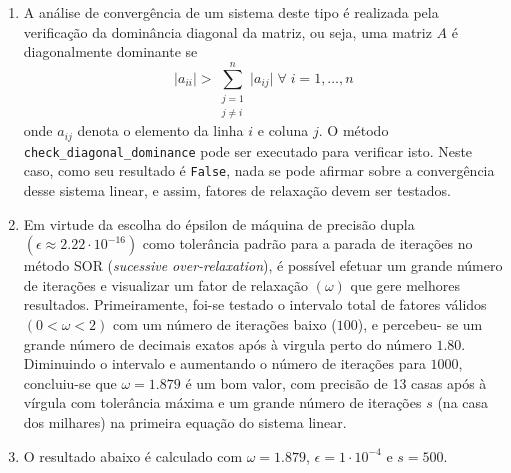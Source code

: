 \documentclass{sftex/sftex}
\begin{document}
\begin{enumerate}
\begin{enumerate}
\item A análise de convergência de um sistema deste tipo é realizada pela
verificação da dominância diagonal da matriz, ou seja, uma matriz $A$ é
diagonalmente dominante se
\begin{equation*}
\vert a_{ii} \vert > \sum_{\substack{j=1 \\ j \neq i}}^n \vert a_{ij} \vert
\; \forall \; i = 1, \dots, n
\end{equation*}
onde $a_{ij}$ denota o elemento da linha $i$ e coluna $j$. O método
\texttt{check\_diagonal\_dominance} pode ser executado para verificar isto.
Neste caso, como seu resultado é \verb!False!, nada se pode afirmar sobre a
convergência desse sistema linear, e assim, fatores de relaxação devem ser
testados.

\item Em virtude da escolha do épsilon de máquina de precisão dupla $(\epsilon
\approx 2.22 \cdot 10^{-16})$ como tolerância padrão para a parada de iterações
no método SOR (\emph{sucessive over-relaxation}), é possível efetuar um grande
número de iterações e visualizar um fator de relaxação $(\omega)$ que gere
melhores resultados. Primeiramente, foi-se testado o intervalo total de fatores
válidos $(0 < \omega < 2)$ com um número de iterações baixo ($100$), e percebeu-
se um grande número de decimais exatos após à virgula perto do número
$\boldsymbol{1.80}$. Diminuindo o intervalo e aumentando o número de iterações
para $1000$, concluiu-se que $\omega = \boldsymbol{1.879}$ é um bom valor, com
precisão de 13 casas após à vírgula com tolerância máxima e um grande número de
iterações $s$ (na casa dos milhares) na primeira equação do sistema linear.

\item O resultado abaixo é calculado com $\omega = 1.879$,
$\epsilon = 1 \cdot 10^{-4}$ e $s = 500$.


\end{enumerate}
\end{enumerate}
\end{document}

